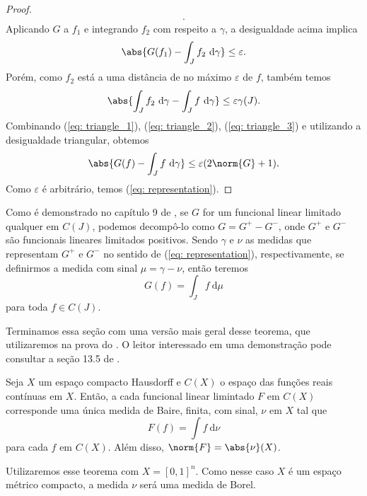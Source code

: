 \begin{proof}
\begin{align*}
    .\end{align*}
    Aplicando \( G \) a \( f_{ 1 } \) e integrando \( f_{ 2 } \) com respeito a \( \gamma \), a desigualdade acima implica
    \begin{equation}
        \abs{ 
            G(f_{ 1 }) - \int_{ J } f_{ 2 } \ \mathrm{d}\gamma
        }
        \leq \varepsilon
        \label{eq: triangle_2}
    .\end{equation}
    Porém, como \( f_{ 2 } \) está a uma distância de no máximo \( \varepsilon \) de \( f \), também temos
    \begin{equation}
        \abs{ 
            \int_{ J } f_{ 2 } \ \mathrm{d}\gamma
            - \int_{ J } f \ \mathrm{d}\gamma
        }
        \leq \varepsilon \gamma(J)
        \label{eq: triangle_3}
    .\end{equation}
    Combinando (\ref{eq: triangle_1}), (\ref{eq: triangle_2}), (\ref{eq: triangle_3}) e utilizando a desigualdade triangular, obtemos \[
        \abs{ G(f) - \int_{ J } f \ \mathrm{d}\gamma }
        \leq \varepsilon (2 \norm{ G } + 1)
    .\]
    Como \( \varepsilon \) é arbitrário, temos (\ref{eq: representation}).
\end{proof}

\begin{rem}
    Como é demonstrado no capítulo 9 de \cite{bartle}, se \( G \) for um funcional linear limitado qualquer em \( C(J) \), podemos decompô-lo como \( G = G^{ + } - G^{ - } \), onde \( G^{ + } \) e \( G^{ - } \) são funcionais lineares limitados positivos.
    Sendo \( \gamma \) e \( \nu \) as medidas que representam \( G^{ + } \) e \( G^{ - } \) no sentido de (\ref{eq: representation}), respectivamente, se definirmos a medida com sinal \( \mu = \gamma - \nu \), então teremos \[
        G(f) = \int_{ J } f \ \mathrm{d}\mu
    \]
    para toda \( f \in C(J) \).
\end{rem}

Terminamos essa seção com uma versão mais geral desse teorema, que utilizaremos na prova do \uat.
O leitor interessado em uma demonstração pode consultar a seção 13.5 de \cite{royden}.

\begin{Riesz}
    Seja \( X \) um espaço compacto Hausdorff e \( C(X) \) o espaço das funções reais contínuas em \( X \).
    Então, a cada funcional linear limintado \( F \) em \( C(X) \) corresponde uma única medida de Baire, finita, com sinal, \( \nu \) em \( X \) tal que \[
        F(f) = \int f \ \mathrm{d}\nu
    \]
    para cada \( f \) em \( C(X) \).
    Além disso, \( \norm{ F } = \abs{ \nu }(X) \).
\end{Riesz}

\begin{rem}
    Utilizaremos esse teorema com \( X = [0, 1]^{ n } \).
    Como nesse caso \( X \) é um espaço métrico compacto, a medida \( \nu \) será uma medida de Borel.
\end{rem}